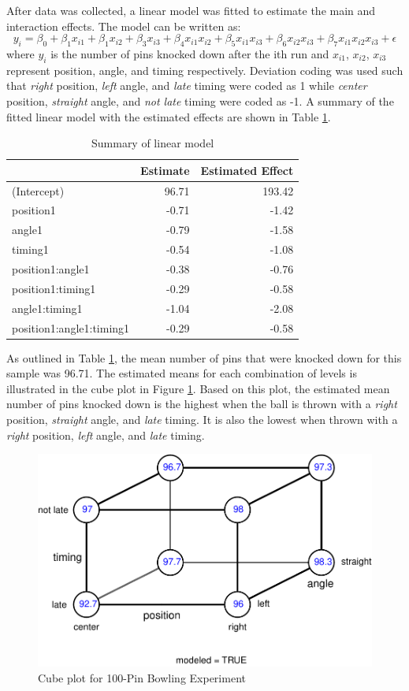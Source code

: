 \documentclass[
]{article}
\begin{document}
After data was collected, a linear model was fitted to estimate the main and interaction effects. The model can be written as:
\[
y_i = \beta_0 + \beta_1x_{i1} + \beta_1x_{i2} + \beta_3x_{i3} + \beta_4x_{i1}x_{i2} + \beta_5x_{i1}x_{i3} + \beta_6x_{i2}x_{i3} + \beta_7x_{i1}x_{i2}x_{i3} + \epsilon
\]
where \(y_i\) is the number of pins knocked down after the ith run and \(x_{i1}\), \(x_{i2}\), \(x_{i3}\) represent position, angle, and timing respectively. Deviation coding was used such that \emph{right} position, \emph{left} angle, and \emph{late} timing were coded as 1 while \emph{center} position, \emph{straight} angle, and \emph{not late} timing were coded as -1. A summary of the fitted linear model with the estimated effects are shown in Table \ref{tab:lmtable}.

\begin{table}[H]

\caption{\label{tab:lmtable}Summary of linear model}
\centering
\begin{tabular}[t]{lrr}
\toprule
  & Estimate & Estimated Effect\\
\midrule
\rowcolor[HTML]{F5F9FF}  (Intercept) & 96.71 & 193.42\\
position1 & -0.71 & -1.42\\
\rowcolor[HTML]{F5F9FF}  angle1 & -0.79 & -1.58\\
timing1 & -0.54 & -1.08\\
\rowcolor[HTML]{F5F9FF}  position1:angle1 & -0.38 & -0.76\\
position1:timing1 & -0.29 & -0.58\\
\rowcolor[HTML]{F5F9FF}  angle1:timing1 & -1.04 & -2.08\\
position1:angle1:timing1 & -0.29 & -0.58\\
\bottomrule
\end{tabular}
\end{table}

As outlined in Table \ref{tab:lmtable}, the mean number of pins that were knocked down for this sample was 96.71. The estimated means for each combination of levels is illustrated in the cube plot in Figure \ref{fig:cubeplot}. Based on this plot, the estimated mean number of pins knocked down is the highest when the ball is thrown with a \emph{right} position, \emph{straight} angle, and \emph{late} timing. It is also the lowest when thrown with a \emph{right} position, \emph{left} angle, and \emph{late} timing.

\begin{figure}

{\centering \includegraphics[width=.4\linewidth]{report_files/figure-latex/cubeplot-1} 

}

\caption{Cube plot for 100-Pin Bowling Experiment}\label{fig:cubeplot}
\end{figure}
\end{document}
